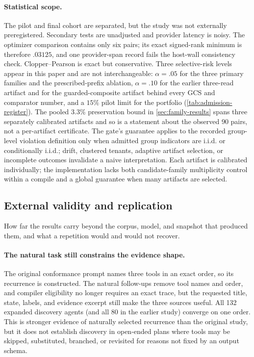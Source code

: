 \paragraph{Statistical scope.}
The pilot and final cohort are separated, but the study was not externally preregistered.
Secondary tests are unadjusted and provider latency is noisy.  The optimizer comparison
contains only six pairs; its exact signed-rank minimum is therefore $.03125$, and one
provider-span record fails the host-wall consistency check.  Clopper--Pearson is exact
but conservative.  Three selective-risk levels appear in this paper and are not
interchangeable: $\alpha=.05$ for the three primary families and the prescribed-prefix
ablation, $\alpha=.10$ for the earlier three-read artifact and for the guarded-composite
artifact behind every GCS and comparator number, and a $15\%$ pilot limit for the portfolio
(\cref{tab:admission-register}).  The pooled 3.3\% preservation bound in
\cref{sec:family-results} spans three separately calibrated artifacts and so is a statement
about the observed 90 pairs, not a per-artifact certificate.  The gate's guarantee applies to the recorded group-level violation
definition only when admitted group indicators are i.i.d. or conditionally i.i.d.; drift,
clustered tenants, adaptive artifact selection, or incomplete outcomes invalidate a naive
interpretation.  Each artifact is calibrated individually; the implementation lacks both
candidate-family multiplicity control within a compile and a global guarantee when many
artifacts are selected.

\subsection{External validity and replication}

How far the results carry beyond the corpus, model, and snapshot that produced them, and what a repetition would and would not recover.

\paragraph{The natural task still constrains the evidence shape.}
The original conformance prompt names three tools in an exact order, so its recurrence is
constructed.  The natural follow-ups remove tool names and order, and compiler eligibility
no longer requires an exact trace, but the requested title, state, labels, and evidence
excerpt still make the three sources useful.  All 132 expanded discovery agents (and all
80 in the earlier study) converge on one order.  This is
stronger evidence of naturally selected recurrence than the original study, but it does
not establish discovery in open-ended plans where tools may be skipped, substituted,
branched, or revisited for reasons not fixed by an output schema.


